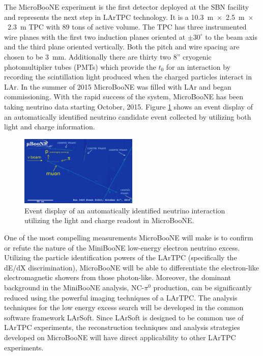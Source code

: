 \label{sec:IF_MicroBooNE}
The MicroBooNE experiment is the first detector deployed at the SBN facility and represents the next step in LArTPC technology. It is a 10.3~m~$\times$~2.5~m~$\times$~2.3~m TPC with 89 tons of active volume. The TPC has three instrumented wire planes with the first two induction planes oriented at $\pm 30^{\circ}$ to the beam axis and the third plane oriented vertically. Both the pitch and wire spacing are chosen to be 3~mm. Additionally there are thirty two 8'' cryogenic photomultiplier tubes (PMTs) which provide the $t_{0}$ for an interaction by recording the scintillation light produced when the charged particles interact in LAr. In the summer of 2015 MicroBooNE was filled with LAr and began commissioning.  With the rapid success of the system, MicroBooNE has been taking neutrino data starting October, 2015. Figure \ref{fig:uboone} shows an event display of an automatically identified neutrino candidate event collected by utilizing both light and charge information. 

\begin{figure}[htb]
\centering
\includegraphics[width=0.50\textwidth]{images/ubooneNeutrino.png}
\caption[]{Event display of an automatically identified neutrino interaction utilizing the light and charge readout in MicroBooNE.}
\label{fig:uboone}
\end{figure}

One of the most compelling measurements MicroBooNE will make is to confirm or refute the nature of the MiniBooNE low-energy electron neutrino excess. Utilizing the particle identification powers of the LArTPC (specifically the dE/dX discrimination), MicroBooNE will be able to differentiate the electron-like electromagnetic showers from those photon-like. Moreover, the dominant background in the MiniBooNE analysis, NC-$\pi^{0}$ production, can be significantly reduced using the powerful imaging techniques of a LArTPC. The analysis techniques for the low energy excess search will be developed in the common software framework LArSoft. Since LArSoft is designed to be common use of LArTPC experiments, the reconstruction techniques and analysis strategies developed on MicroBooNE will have direct applicability to other LArTPC experiments.

